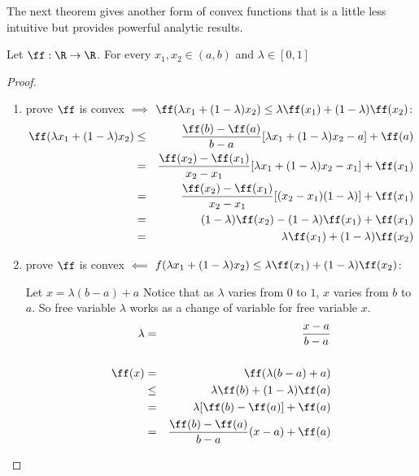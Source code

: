 The next theorem gives another form of convex functions that is a little
less intuitive but provides powerful analytic results.
\begin{theorem}
\label{thm:convex_lambda}
Let $\ff:\R\to\R$.
For every $x_1,x_2\in(a,b)$ and $\lambda\in[0,1]$
\end{theorem}
\begin{proof}
\begin{enumerate}
  \item prove $\ff$ is convex $\implies$
        $\ff(\lambda x_1+(1-\lambda)x_2) \le \lambda\ff(x_1) + (1-\lambda)\ff(x_2)$:
  \begin{eqnarray*}
    \ff(\lambda x_1+(1-\lambda)x_2)
      &\le& \frac{\ff(b)-\ff(a)}{b-a}[\lambda x_1+(1-\lambda)x_2-a] + \ff(a)
    \\&=&   \frac{\ff(x_2)-\ff(x_1)}{x_2-x_1}[\lambda x_1+(1-\lambda)x_2-x_1] + \ff(x_1)
    \\&=&   \frac{\ff(x_2)-\ff(x_1)}{x_2-x_1}[(x_2-x_1)(1-\lambda)] + \ff(x_1)
    \\&=&   (1-\lambda)\ff(x_2)-(1-\lambda)\ff(x_1) + \ff(x_1)
    \\&=&   \lambda\ff(x_1) + (1-\lambda)\ff(x_2)
  \end{eqnarray*}
  \item prove $\ff$ is convex $\impliedby$
        $f(\lambda x_1+(1-\lambda)x_2) \le \lambda\ff(x_1) + (1-\lambda)\ff(x_2)$:

  Let $x=\lambda(b-a)+a$ Notice that as $\lambda$ varies from $0$ to $1$,
      $x$ varies from $b$ to $a$.
      So free variable $\lambda$ works as a change of variable for
      free variable $x$.
  \begin{eqnarray*}
    \lambda &=& \frac{x-a}{b-a} \\
\\
    \ff(x)
      &=&   \ff(\lambda(b-a)+a)
    \\&\le& \lambda\ff(b) + (1-\lambda)\ff(a)
    \\&=&   \lambda[\ff(b)-\ff(a)] + \ff(a)
    \\&=&   \frac{\ff(b)-\ff(a)}{b-a}(x-a) + \ff(a)
  \end{eqnarray*}
\end{enumerate}
\end{proof}

